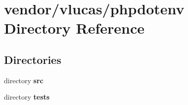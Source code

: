 \section{vendor/vlucas/phpdotenv Directory Reference}
\label{dir_90403a3e5c92854ae0488d4cd49e451b}
\subsection*{Directories}
\begin{DoxyCompactItemize}
\item 
directory {\bf src}
\item 
directory {\bf tests}
\end{DoxyCompactItemize}
